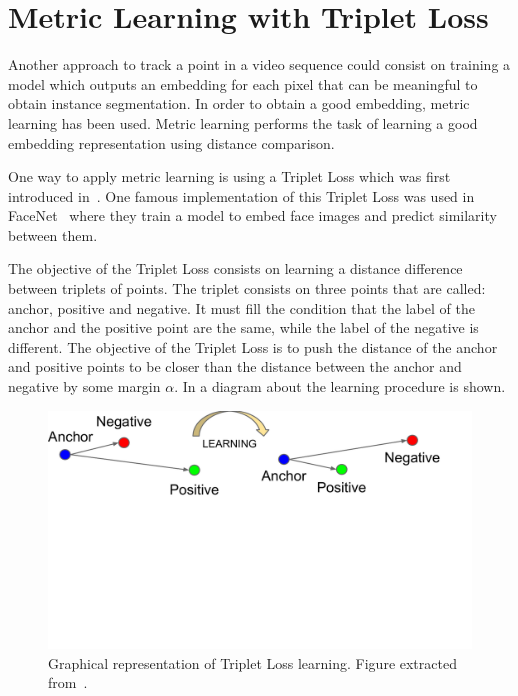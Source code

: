 \section{Metric Learning with Triplet Loss}
\label{sec:methods:metriclearning}

Another approach to track a point in a video sequence could consist on training a model which outputs an embedding for each pixel that can be meaningful to obtain instance segmentation.
In order to obtain a good embedding, metric learning has been used.
Metric learning performs the task of learning a good embedding representation using distance comparison.

One way to apply metric learning is using a Triplet Loss which was first introduced in~\metriclearning{}.
One famous implementation of this Triplet Loss was used in FaceNet~\facenet{} where they train a model to embed face images and predict similarity between them.

The objective of the Triplet Loss consists on learning a distance difference between triplets of points.
The triplet consists on three points that are called: anchor, positive and negative.
It must fill the condition that the label of the anchor and the positive point are the same, while the label of the negative is different.
The objective of the Triplet Loss is to push the distance of the anchor and positive points to be closer than the distance between the anchor and negative by some margin $\alpha$.
In  a diagram about the learning procedure is shown.

\begin{figure}[h]
  \centering
  \includegraphics[trim=1cm 10cm 2.5cm 0cm, width=0.7\linewidth]{figures/methods/triplet_loss/triplet_viz.pdf}
  \caption{
    Graphical representation of Triplet Loss learning.
  Figure extracted from~\facenet{}. }
    \label{fig:tripletloss:visualization}
\end{figure}


